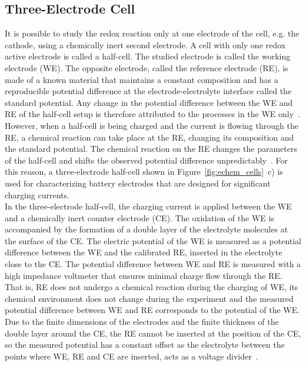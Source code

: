 \subsection{Three-Electrode Cell}
It is possible to study the redox reaction only at one electrode of the cell, e.g. the cathode, using a chemically inert second electrode. A cell with only one redox active electrode is called a half-cell. The studied electrode is called the working electrode (WE). The opposite electrode, called the reference electrode (RE), is made of a known material that maintains a constant composition and has a reproducible potential difference at the electrode-electrolyte interface called the standard potential. Any change in the potential difference between the WE and RE of the half-cell setup is therefore attributed to the processes in the WE only~\cite{Bard_book}.\\
However, when a half-cell is being charged and the current is flowing through the RE, a chemical reaction can take place at the RE, changing its composition and the standard potential. The chemical reaction on the RE changes the parameters of the half-cell and shifts the observed potential difference unpredictably~\cite{Bard_book,DOM}. For this reason, a three-electrode half-cell shown in Figure~\ref{fig:echem_cells}~c) is used for characterizing battery electrodes that are designed for significant charging currents.\\

In the three-electrode half-cell, the charging current is applied between the WE and a chemically inert counter electrode (CE). The oxidation of the WE is accompanied by the formation of a double layer of the electrolyte molecules at the surface of the CE. The electric potential of the WE is measured as a potential difference between the WE and the calibrated RE, inserted in the electrolyte close to the CE. The potential difference between WE and RE is measured with a high impedance voltmeter that ensures minimal charge flow through the RE. That is, RE does not undergo a chemical reaction during the charging of WE, its chemical environment does not change during the experiment and the measured potential difference between WE and RE corresponds to the potential of the WE. Due to the finite dimensions of the electrodes and the finite thickness of the double layer around the CE, the RE cannot be inserted at the position of the CE, so the measured potential has a constant offset as the electrolyte between the points where WE, RE and CE are inserted, acts as a voltage divider~\cite{Bard_book}.\\

